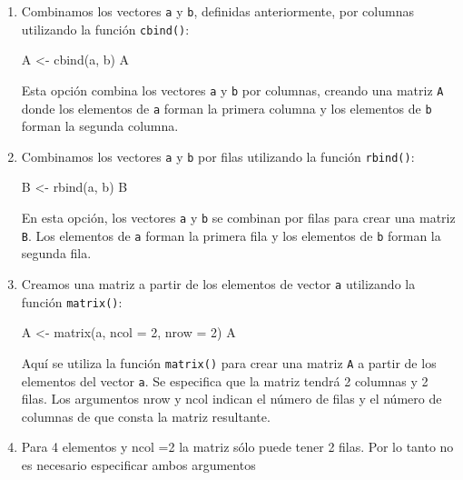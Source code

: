 \documentclass[
  letterpaper,
  DIV=11,
  numbers=noendperiod]{scrartcl}
\newenvironment{Shaded}{}{}
\newcommand{\AttributeTok}[1]{\textcolor[rgb]{0.84,0.23,0.29}{#1}}
\newcommand{\DecValTok}[1]{\textcolor[rgb]{0.00,0.36,0.77}{#1}}
\newcommand{\FunctionTok}[1]{\textcolor[rgb]{0.44,0.26,0.76}{#1}}
\newcommand{\NormalTok}[1]{\textcolor[rgb]{0.14,0.16,0.18}{#1}}
\newcommand{\OtherTok}[1]{\textcolor[rgb]{0.44,0.26,0.76}{#1}}
\begin{document}
\begin{enumerate}
\def\labelenumi{\arabic{enumi}.}
\item
  Combinamos los vectores \texttt{a} y \texttt{b}, definidas
  anteriormente, por columnas utilizando la función \texttt{cbind()}:

\begin{Shaded}
\begin{Highlighting}[]
\NormalTok{A }\OtherTok{\textless{}{-}} \FunctionTok{cbind}\NormalTok{(a, b)}
\NormalTok{A}
\end{Highlighting}
\end{Shaded}

  Esta opción combina los vectores \texttt{a} y \texttt{b} por columnas,
  creando una matriz \texttt{A} donde los elementos de \texttt{a} forman
  la primera columna y los elementos de \texttt{b} forman la segunda
  columna.
\item
  Combinamos los vectores \texttt{a} y \texttt{b} por filas utilizando
  la función \texttt{rbind()}:

\begin{Shaded}
\begin{Highlighting}[]
\NormalTok{B }\OtherTok{\textless{}{-}} \FunctionTok{rbind}\NormalTok{(a, b)}
\NormalTok{B}
\end{Highlighting}
\end{Shaded}

  En esta opción, los vectores \texttt{a} y \texttt{b} se combinan por
  filas para crear una matriz \texttt{B}. Los elementos de \texttt{a}
  forman la primera fila y los elementos de \texttt{b} forman la segunda
  fila.
\item
  Creamos una matriz a partir de los elementos de vector \texttt{a}
  utilizando la función \texttt{matrix()}:

\begin{Shaded}
\begin{Highlighting}[]
\NormalTok{A }\OtherTok{\textless{}{-}} \FunctionTok{matrix}\NormalTok{(a, }\AttributeTok{ncol =} \DecValTok{2}\NormalTok{, }\AttributeTok{nrow =} \DecValTok{2}\NormalTok{)}
\NormalTok{A}
\end{Highlighting}
\end{Shaded}

  Aquí se utiliza la función \texttt{matrix()} para crear una matriz
  \texttt{A} a partir de los elementos del vector \texttt{a}. Se
  especifica que la matriz tendrá 2 columnas y 2 filas. Los argumentos
  nrow y ncol indican el número de filas y el número de columnas de que
  consta la matriz resultante.
\item
  Para 4 elementos y ncol =2 la matriz sólo puede tener 2 filas. Por lo
  tanto no es necesario especificar ambos argumentos


\end{enumerate}
\end{document}
